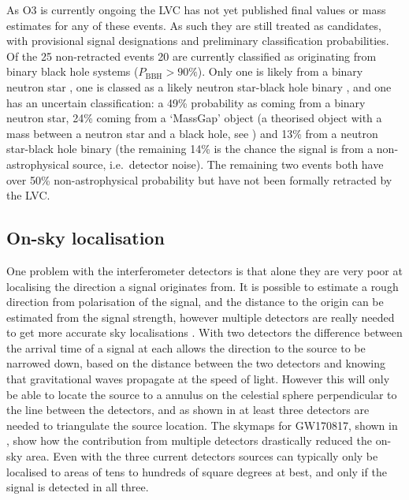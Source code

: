 \begin{colsection}
\begin{colsection}
As O3 is currently ongoing the LVC has not yet published final values or mass estimates for any of these events. As such they are still treated as candidates, with provisional signal designations and preliminary classification probabilities. Of the 25 non-retracted events 20 are currently classified as originating from binary black hole systems ($P_\text{BBH}>90\%$). Only one is likely from a binary neutron star \citep[S190425z, ][]{S190425z}, one is classed as a likely neutron star-black hole binary \citep[S190814bv, ][]{S190814bv}, and one \citep[S190426c, ][]{S190426c} has an uncertain classification: a 49\% probability as coming from a binary neutron star, 24\% coming from a `MassGap' object (a theorised object with a mass between a neutron star and a black hole, see \citet{GW_MassGap}) and 13\% from a neutron star-black hole binary (the remaining 14\% is the chance the signal is from a non-astrophysical source, i.e.\ detector noise). The remaining two events both have over 50\% non-astrophysical probability but have not been formally retracted by the LVC.\@

\end{colsection}

\newpage
\subsection{On-sky localisation}
\label{sec:gw_localisation}
\begin{colsection}

One problem with the interferometer detectors is that alone they are very poor at localising the direction a signal originates from. It is possible to estimate a rough direction from polarisation of the signal, and the distance to the origin can be estimated from the signal strength, however multiple detectors are really needed to get more accurate sky localisations \citep{GW_localisation, GW_localisation2}. With two detectors the difference between the arrival time of a signal at each allows the direction to the source to be narrowed down, based on the distance between the two detectors and knowing that gravitational waves propagate at the speed of light. However this will only be able to locate the source to a annulus on the celestial sphere perpendicular to the line between the detectors, and as shown in  at least three detectors are needed to triangulate the source location. The skymaps for GW170817, shown in , show how the contribution from multiple detectors drastically reduced the on-sky area. Even with the three current detectors sources can typically only be localised to areas of tens to hundreds of square degrees at best, and only if the signal is detected in all three.


\end{colsection}
\end{colsection}
